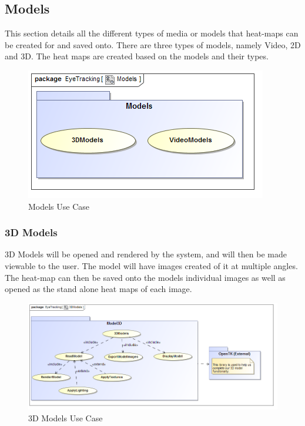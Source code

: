 \subsection{Models}
This section details all the different types of media or models that heat-maps can be created for and saved onto. There are three types of models, namely Video, 2D and 3D. The heat maps are created based on the models and their types.
\newline
\begin{figure}[!ht]
	\centering	
	\includegraphics[scale=0.5]{Diagrams/Use_Case_Diagram__Models.png}
	\caption{Models Use Case}
\end{figure}
	
	\subsubsection{3D Models}
	3D Models will be opened and rendered by the system, and will then be made viewable to the user. The model will have images created of it at multiple angles. The heat-map can then be saved onto the models individual images as well as opened as the stand alone heat maps of each image.
	\newline
	\begin{figure}[!ht]
		\centering
		\includegraphics[scale=0.5]{Diagrams/Use_Case_Diagram__3DModels.png}
		\caption{3D Models Use Case}
	\end{figure}
	
